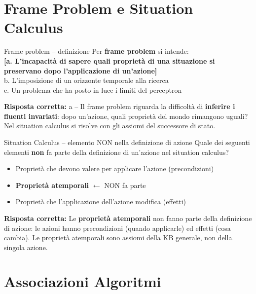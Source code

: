 \documentclass[12pt,a4paper]{article}
\newcommand{\corr}[1]{\textcolor{green!55!black}{\textbf{[#1]}}}
\newcommand{\risp}[1]{\begin{abox}\textbf{Risposta corretta: }#1\end{abox}}
\begin{document}
\section{Frame Problem e Situation Calculus}

\begin{qbox}{Frame problem -- definizione}
Per \textbf{frame problem} si intende:
\\[4pt]
\corr{a. L'incapacità di sapere quali proprietà di una situazione si preservano dopo l'applicazione di un'azione}\\
b. L'imposizione di un orizzonte temporale alla ricerca\\
c. Un problema che ha posto in luce i limiti del perceptron
\end{qbox}
\risp{a -- Il frame problem riguarda la difficoltà di \textbf{inferire i fluenti invariati}: dopo un'azione, quali proprietà del mondo rimangono uguali? Nel situation calculus si risolve con gli assiomi del successore di stato.}

\bigskip
\begin{qbox}{Situation Calculus -- elemento NON nella definizione di azione}
Quale dei seguenti elementi \textbf{non} fa parte della definizione di un'azione nel situation calculus?
\begin{itemize}[noitemsep]
  \item Proprietà che devono valere per applicare l'azione (precondizioni)
  \item \textbf{Proprietà atemporali} $\leftarrow$ NON fa parte
  \item Proprietà che l'applicazione dell'azione modifica (effetti)
\end{itemize}
\end{qbox}
\risp{Le \textbf{proprietà atemporali} non fanno parte della definizione di azione: le azioni hanno precondizioni (quando applicarle) ed effetti (cosa cambia). Le proprietà atemporali sono assiomi della KB generale, non della singola azione.}

\section{Associazioni Algoritmi}
\end{document}

